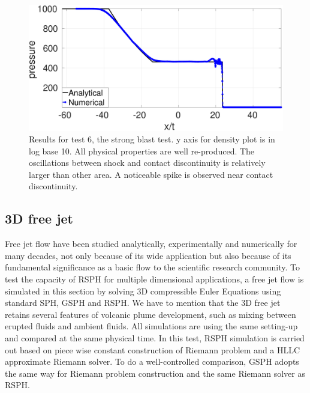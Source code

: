 \begin{figure}[H]
\begin{minipage}{.495 \textwidth}
    \end{minipage}%
    \begin{minipage}{.495 \textwidth}
        \centering
        \includegraphics[width=0.99 \textwidth]{Chapter-4/Figures/strong-blast/StrBlst-RCM-p-Rp3}
    \end{minipage}%
    \caption{Results for test 6, the strong blast test. y axis for density plot is in log base 10. All physical properties are well re-produced. The oscillations between shock and contact discontinuity is relatively larger than other area. A noticeable spike is observed near contact discontinuity.}
    \label{fig:RCM-strong-blast}
\end{figure}

\subsection{3D free jet}
Free jet flow have been studied analytically, experimentally and numerically for many decades, not only because of its wide application but also because of its fundamental significance as a basic flow to the scientific research community. To test the capacity of RSPH for multiple dimensional applications, a free jet flow is simulated in this section by solving 3D compressible Euler Equations using standard SPH, GSPH and RSPH. We have to mention that the 3D free jet retains several features of volcanic plume development, such as mixing between erupted fluids and ambient fluids.
All simulations are using the same setting-up and compared at the same physical time. In this test, RSPH simulation is carried out based on piece wise constant construction of Riemann problem and a HLLC approximate Riemann solver. To do a well-controlled comparison, GSPH adopts the same way for Riemann problem construction and the same Riemann solver as RSPH. 

